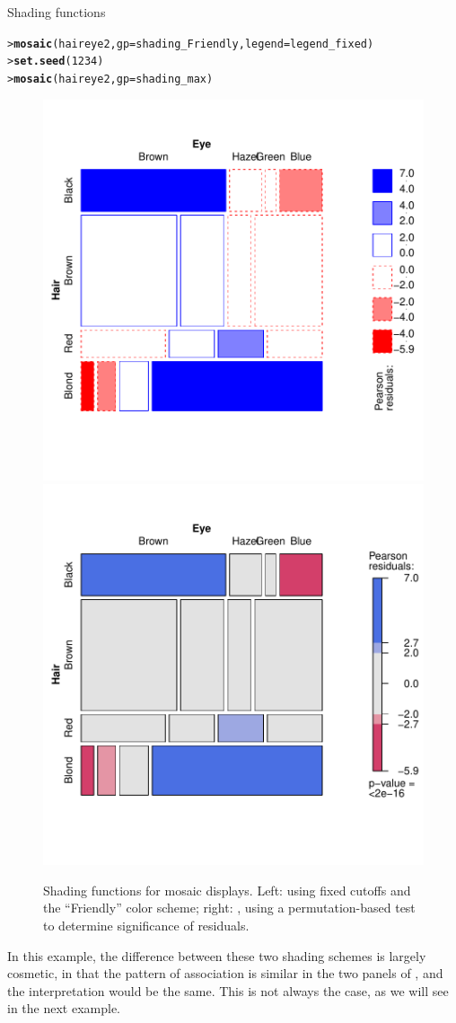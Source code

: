 \documentclass[10pt,krantz2]{krantz}\usepackage[]{graphicx}\usepackage[]{color}
\makeatletter
\newcommand{\hlnum}[1]{\textcolor[rgb]{0.686,0.059,0.569}{#1}}%
\newcommand{\hlstd}[1]{\textcolor[rgb]{0.345,0.345,0.345}{#1}}%
\newcommand{\hlkwc}[1]{\textcolor[rgb]{0.333,0.667,0.333}{#1}}%
\newcommand{\hlkwd}[1]{\textcolor[rgb]{0.737,0.353,0.396}{\textbf{#1}}}%
\newenvironment{kframe}{%
 \def\at@end@of@kframe{}%
 \ifinner\ifhmode%
  \def\at@end@of@kframe{\end{minipage}}%
  \begin{minipage}{\columnwidth}%
 \fi\fi%
 \def\FrameCommand##1{\hskip\@totalleftmargin \hskip-\fboxsep
 \colorbox{shadecolor}{##1}\hskip-\fboxsep
     \hskip-\linewidth \hskip-\@totalleftmargin \hskip\columnwidth}%
 \MakeFramed {\advance\hsize-\width
   \@totalleftmargin\z@ \linewidth\hsize
   \@setminipage}}%
 {\par\unskip\endMakeFramed%
 \at@end@of@kframe}
\newenvironment{knitrout}{}{} %
\renewenvironment{knitrout}{\small\renewcommand{\baselinestretch}{.85}}{} %
\makeatother
\begin{document}
\begin{Example}[shading]{Shading functions}
\begin{knitrout}
\color{fgcolor}\begin{kframe}
\begin{alltt}
\hlstd{> }\hlkwd{mosaic}\hlstd{(haireye2,} \hlkwc{gp} \hlstd{= shading_Friendly,} \hlkwc{legend} \hlstd{= legend_fixed)}
\hlstd{> }\hlkwd{set.seed}\hlstd{(}\hlnum{1234}\hlstd{)}
\hlstd{> }\hlkwd{mosaic}\hlstd{(haireye2,} \hlkwc{gp} \hlstd{= shading_max)}
\end{alltt}
\end{kframe}\begin{figure}[!htbp]

\centerline{\includegraphics[width=.49\textwidth]{ch05/fig/HE-shading-1} 
\includegraphics[width=.49\textwidth]{ch05/fig/HE-shading-2} }

\caption{Shading functions for mosaic displays. Left:  using fixed cutoffs and the ``Friendly'' color scheme; right: , using a permutation-based test to determine significance of residuals.\label{fig:HE-shading}}
\end{figure}


\end{knitrout}
In this example, the difference between these two shading schemes is largely cosmetic, in that
the pattern of association is similar in the two panels of , and the
interpretation would be the same.  This is not always the case, as we will see in the
next example.
\end{Example}
\end{document}
